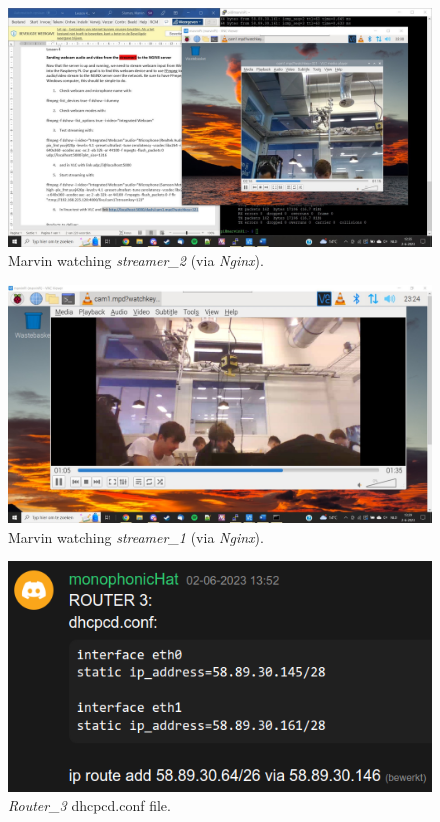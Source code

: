 \documentclass[a4paper,1pt]{article}
\begin{document}
\begin{figure}[H]
	\centering
	\includegraphics[width=\textwidth]{WorkingStream.jpg}
	\caption{Marvin watching \textit{streamer\_2} (via \textit{Nginx}).}
	\label{fig:marvi2n2}
\end{figure}

\begin{figure}[H]
	\centering
	\includegraphics[width=\textwidth]{WorkingStream2.jpg}
	\caption{Marvin watching \textit{streamer\_1} (via \textit{Nginx}).}
	\label{fig:mar2vi2n2}
\end{figure}

\begin{figure}[H]
	\centering
	\includegraphics[width=\textwidth]{ferhat.png}
	\caption{\textit{Router\_3 } dhcpcd.conf file.}
	\label{fig:ferhat2}
\end{figure}
\end{document}
